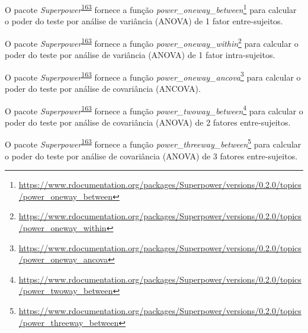\documentclass[
  a4paper,
]{book}
\renewcommand{\href}[2]{#2\footnote{\url{#1}}}
\newenvironment{infobox}[1]
  {
  \begin{itemize}
  \renewcommand{\labelitemi}{
    \raisebox{-.7\height}[0pt][0pt]{
      {\setkeys{Gin}{width=3em,keepaspectratio}
        \texttt{[image: \#1]}}
    }
  }
  \setlength{\fboxsep}{1em}
  \begin{blackbox}
  \item
  }
  {
  \end{blackbox}
  \end{itemize}
  }
\begin{document}
\begin{infobox}{images/Rlogo}
O pacote \emph{Superpower}\textsuperscript{\protect\hyperlink{ref-Superpower}{163}} fornece a função \href{https://www.rdocumentation.org/packages/Superpower/versions/0.2.0/topics/power_oneway_between}{\emph{power\_oneway\_between}} para calcular o poder do teste por análise de variância (ANOVA) de 1 fator entre-sujeitos.

\end{infobox}

\begin{infobox}{images/Rlogo}
O pacote \emph{Superpower}\textsuperscript{\protect\hyperlink{ref-Superpower}{163}} fornece a função \href{https://www.rdocumentation.org/packages/Superpower/versions/0.2.0/topics/power_oneway_within}{\emph{power\_oneway\_within}} para calcular o poder do teste por análise de variância (ANOVA) de 1 fator intra-sujeitos.

\end{infobox}

\begin{infobox}{images/Rlogo}
O pacote \emph{Superpower}\textsuperscript{\protect\hyperlink{ref-Superpower}{163}} fornece a função \href{https://www.rdocumentation.org/packages/Superpower/versions/0.2.0/topics/power_oneway_ancova}{\emph{power\_oneway\_ancova}} para calcular o poder do teste por análise de covariância (ANCOVA).

\end{infobox}

\begin{infobox}{images/Rlogo}
O pacote \emph{Superpower}\textsuperscript{\protect\hyperlink{ref-Superpower}{163}} fornece a função \href{https://www.rdocumentation.org/packages/Superpower/versions/0.2.0/topics/power_twoway_between}{\emph{power\_twoway\_between}} para calcular o poder do teste por análise de covariância (ANOVA) de 2 fatores entre-sujeitos.

\end{infobox}

\begin{infobox}{images/Rlogo}
O pacote \emph{Superpower}\textsuperscript{\protect\hyperlink{ref-Superpower}{163}} fornece a função \href{https://www.rdocumentation.org/packages/Superpower/versions/0.2.0/topics/power_threeway_between}{\emph{power\_threeway\_between}} para calcular o poder do teste por análise de covariância (ANOVA) de 3 fatores entre-sujeitos.

\end{infobox}
\end{document}
